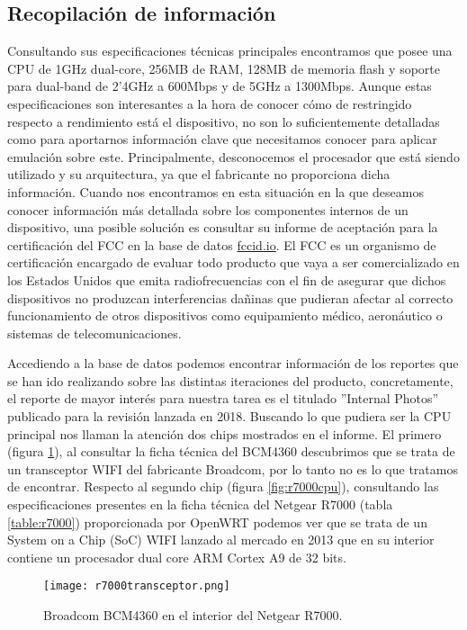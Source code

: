 \subsection{Recopilación de información}
Consultando sus especificaciones técnicas principales 
encontramos que posee una CPU de 1GHz dual-core, 256MB de RAM, 128MB de memoria flash y soporte para dual-band de 2'4GHz a 600Mbps y de 5GHz a 
1300Mbps. Aunque estas especificaciones son interesantes a la hora de conocer cómo de restringido respecto a rendimiento está el dispositivo,
no son lo suficientemente detalladas como para aportarnos información clave que necesitamos conocer para aplicar emulación sobre este.
Principalmente, desconocemos el procesador que está siendo utilizado y su arquitectura, ya que el fabricante no proporciona dicha información.
Cuando nos encontramos en esta situación en la que deseamos conocer información más detallada sobre los componentes internos de un dispositivo, 
una posible solución es consultar su informe de aceptación para la certificación del FCC\cite{fcc} en la base de datos \hyperlink{fccid.io}{fccid.io}.
El FCC es un organismo de certificación encargado de evaluar todo producto que vaya a ser comercializado en los Estados Unidos que emita 
radiofrecuencias con el fin de asegurar que dichos dispositivos no produzcan interferencias dañinas que pudieran afectar al correcto
funcionamiento de otros dispositivos como equipamiento médico, aeronáutico o sistemas de telecomunicaciones.\bigskip

Accediendo a la base de datos podemos encontrar información de los reportes que se han ido realizando sobre las distintas iteraciones del producto,
concretamente, el reporte de mayor interés para nuestra tarea es el titulado ''Internal Photos'' publicado para la revisión lanzada en 2018\cite{netgearFCCid}.
Buscando lo que pudiera ser la CPU principal nos llaman la atención dos chips mostrados en el informe. El primero (figura \ref{fig:r7000transceptor}), al 
consultar la ficha técnica del BCM4360 descubrimos que se trata de un transceptor WIFI del fabricante Broadcom, por lo tanto no es lo que tratamos de 
encontrar. Respecto al segundo chip (figura \ref{fig:r7000cpu}), consultando las especificaciones presentes en la ficha técnica del Netgear R7000 
(tabla \ref{table:r7000}) proporcionada por OpenWRT podemos ver que se trata de un System on a Chip (SoC) WIFI lanzado al mercado en 2013\cite{broadcomSOCs} 
que en su interior contiene un procesador dual core ARM Cortex A9 de 32 bits.

\begin{figure}[H]
    \centering
    \texttt{[image: r7000transceptor.png]}
    \caption{Broadcom BCM4360 en el interior del Netgear R7000.\cite{netgearFCCid}}
    \label{fig:r7000transceptor}
\end{figure}

